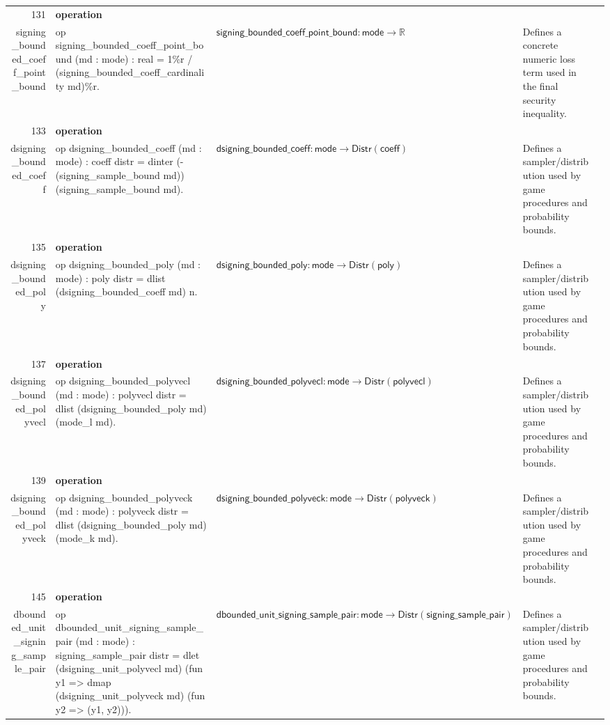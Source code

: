 \documentclass[10pt]{article}
\newcommand{\ec}[1]{\begingroup\ttfamily\scriptsize #1\endgroup}
\begin{document}
\begin{longtable}{r L{0.17\textwidth} L{0.26\textwidth} L{0.27\textwidth} L{0.20\textwidth}}
131 & \textbf{operation}\\\ec{signing\_bounded\_coeff\_point\_bound} & \ec{op signing\_bounded\_coeff\_point\_bound (md : mode) : real = 1\%r / (signing\_bounded\_coeff\_cardinality md)\%r.} & \(\mathsf{signing\_bounded\_coeff\_point\_bound} : \mathsf{mode} \to \mathbb{R}\) & Defines a concrete numeric loss term used in the final security inequality. \\
133 & \textbf{operation}\\\ec{dsigning\_bounded\_coeff} & \ec{op dsigning\_bounded\_coeff (md : mode) : coeff distr = dinter (-(signing\_sample\_bound md)) (signing\_sample\_bound md).} & \(\mathsf{dsigning\_bounded\_coeff} : \mathsf{mode} \to \mathsf{Distr}(\mathsf{coeff})\) & Defines a sampler/distribution used by game procedures and probability bounds. \\
135 & \textbf{operation}\\\ec{dsigning\_bounded\_poly} & \ec{op dsigning\_bounded\_poly (md : mode) : poly distr = dlist (dsigning\_bounded\_coeff md) n.} & \(\mathsf{dsigning\_bounded\_poly} : \mathsf{mode} \to \mathsf{Distr}(\mathsf{poly})\) & Defines a sampler/distribution used by game procedures and probability bounds. \\
137 & \textbf{operation}\\\ec{dsigning\_bounded\_polyvecl} & \ec{op dsigning\_bounded\_polyvecl (md : mode) : polyvecl distr = dlist (dsigning\_bounded\_poly md) (mode\_l md).} & \(\mathsf{dsigning\_bounded\_polyvecl} : \mathsf{mode} \to \mathsf{Distr}(\mathsf{polyvecl})\) & Defines a sampler/distribution used by game procedures and probability bounds. \\
139 & \textbf{operation}\\\ec{dsigning\_bounded\_polyveck} & \ec{op dsigning\_bounded\_polyveck (md : mode) : polyveck distr = dlist (dsigning\_bounded\_poly md) (mode\_k md).} & \(\mathsf{dsigning\_bounded\_polyveck} : \mathsf{mode} \to \mathsf{Distr}(\mathsf{polyveck})\) & Defines a sampler/distribution used by game procedures and probability bounds. \\
145 & \textbf{operation}\\\ec{dbounded\_unit\_signing\_sample\_pair} & \ec{op dbounded\_unit\_signing\_sample\_pair (md : mode) : signing\_sample\_pair distr = dlet (dsigning\_unit\_polyvecl md) (fun y1 => dmap (dsigning\_unit\_polyveck md) (fun y2 => (y1, y2))).} & \(\mathsf{dbounded\_unit\_signing\_sample\_pair} : \mathsf{mode} \to \mathsf{Distr}(\mathsf{signing\_sample\_pair})\) & Defines a sampler/distribution used by game procedures and probability bounds. \\

\end{longtable}
\end{document}

